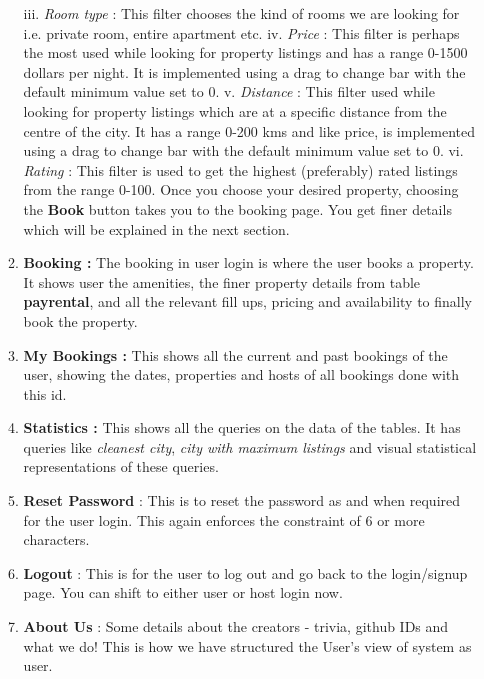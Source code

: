 \documentclass[10pt]{article}
\begin{document}
\begin{enumerate}
\begin{enumerate}
	    \newline
	    iii. \textit{Room type} : \newline This filter chooses the kind of rooms we are looking for i.e. private room, entire apartment etc.  
	    \newline
	    iv. \textit{Price} : \newline
	    This filter is perhaps the most used while looking for property listings and has a range 0-1500 dollars per night. It is implemented using a drag to change bar with the default minimum value set to 0. 
	    \newline
	    v. \textit{Distance} : \newline This filter used while looking for property listings which are at a specific distance from the centre of the city. It has a range 0-200 kms and like price, is implemented using a drag to change bar with the default minimum value set to 0. 
	    \newline
	    vi. \textit{Rating} : \newline
	    This filter is used to get the highest (preferably) rated listings from the range 0-100.
	    \newline
	    Once you choose your desired property, choosing the \textbf{Book} button takes you to the booking page. You get finer details which will be explained in the next section. 
	    \item \textbf{Booking :} The booking in user login is where the user books a property. It shows user the amenities, the finer property details from table \textbf{payrental}, and all the relevant fill ups, pricing and availability to finally book the property. 
	    \item \textbf{My Bookings :} This shows all the current and past bookings of the user, showing the dates, properties and hosts of all bookings done with this id. 
	    \item \textbf{Statistics :} This shows all the queries on the data of the tables. It has queries like \textit{cleanest city}, \textit{city with maximum listings} and visual statistical representations of these queries.  
	    \item \textbf{Reset Password} : This is to reset the password as and when required for the user login. This again enforces the constraint of 6 or more characters.  
	    \item \textbf{Logout} : This is for the user to log out and go back to the login/signup page. You can shift to either user or host login now. 
	    \item \textbf{About Us} : Some details about the creators - trivia, github IDs and what we do! This is how we have structured the User's view of system as user. 

\end{enumerate}
\end{enumerate}
\end{document}
